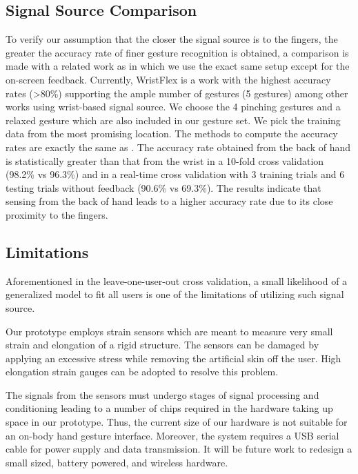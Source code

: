 \documentclass{sigchi}
\begin{document}
\subsection{Signal Source Comparison}
To verify our assumption that the closer the signal source is to the fingers, the greater the accuracy rate of finer gesture recognition is obtained, a comparison is made with a related work \cite{Dementyev:2014:WLG:2642918.2647396} as in which we use the exact same setup except for the on-screen feedback. Currently, WristFlex \cite{Dementyev:2014:WLG:2642918.2647396} is a work with the highest accuracy rates (\textgreater80\%) supporting the ample number of gestures (5 gestures) among other works using wrist-based signal source.
We choose the 4 pinching gestures and a relaxed gesture \cite{Dementyev:2014:WLG:2642918.2647396} which are also included in our gesture set. We pick the training data from the most promising location. The methods to compute the accuracy rates are exactly the same as \cite{Dementyev:2014:WLG:2642918.2647396}. The accuracy rate obtained from the back of hand is statistically greater than that from the wrist in a 10-fold cross validation (98.2\% vs 96.3\%) and in a real-time cross validation with 3 training trials and 6 testing trials without feedback (90.6\% vs 69.3\%). The results indicate that sensing from the back of hand leads to a higher accuracy rate due to its close proximity to the fingers.

\subsection{Limitations}
Aforementioned in the leave-one-user-out cross validation, a small likelihood of a generalized model to fit all users is one of the limitations of utilizing such signal source.

Our prototype employs strain sensors which are meant to measure very small strain and elongation of a rigid structure. The sensors can be damaged by applying an excessive stress while removing the artificial skin off the user. High elongation strain gauges can be adopted to resolve this problem.

The signals from the sensors must undergo stages of signal processing and conditioning leading to a number of chips required in the hardware taking up space in our prototype. Thus, the current size of our hardware is not suitable for an on-body hand gesture interface. Moreover, the system requires a USB serial cable for power supply and data transmission. It will be future work to redesign a small sized, battery powered, and wireless hardware.
\end{document}
